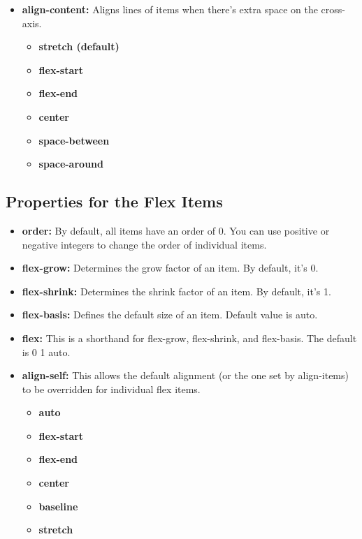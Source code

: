 \documentclass{report}
\begin{document}
\begin{itemize}
    \item \textbf{align-content:} Aligns lines of items when there's extra space on the cross-axis.
    \begin{itemize}
        \item \textbf{stretch (default)}
        \item \textbf{flex-start}
        \item \textbf{flex-end}
        \item \textbf{center}
        \item \textbf{space-between}
        \item \textbf{space-around}
    \end{itemize}
    \end{itemize}

    \bigbreak \noindent 
    \subsection{Properties for the Flex Items}
    \bigbreak \noindent 
    \begin{itemize}
        \item \textbf{order:} By default, all items have an order of 0. You can use positive or negative integers to change the order of individual items.
        \item \textbf{flex-grow:} Determines the grow factor of an item. By default, it's 0.
        \item \textbf{flex-shrink:} Determines the shrink factor of an item. By default, it's 1.
        \item \textbf{flex-basis:} Defines the default size of an item. Default value is auto.
        \item \textbf{flex:} This is a shorthand for flex-grow, flex-shrink, and flex-basis. The default is 0 1 auto.
    \item \textbf{align-self:} This allows the default alignment (or the one set by align-items) to be overridden for individual flex items.
    \begin{itemize}
        \item \textbf{auto}
        \item \textbf{flex-start}
        \item \textbf{flex-end}
        \item \textbf{center}
        \item \textbf{baseline}
        \item \textbf{stretch}
    \end{itemize}

    \end{itemize}
    \bigbreak \noindent 
    
\end{document}
